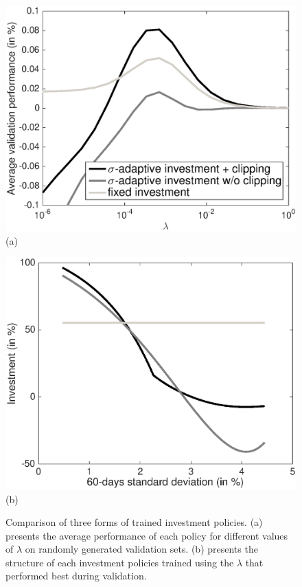 \documentclass[]{interact}
\theoremstyle{plain}%
\theoremstyle{definition}
\theoremstyle{remark}
\newcommand{\0}{\V{0}}
\newcommand{\1}{\V{1}}
\theoremstyle{plain}
\theoremstyle{definition}
\begin{document}
\begin{figure}[h]
\begin{minipage}[t]{0.45\linewidth}
	\centering
	\includegraphics[width=\linewidth]{crossValidate.eps}
	\mbox{(a)}
\end{minipage}
\hfill
\begin{minipage}[t]{0.45\linewidth}
	\centering
	\includegraphics[width=\linewidth]{Policy.eps}
	\mbox{(b)}
\end{minipage}%
\caption{Comparison of three forms of trained investment policies. (a) presents the average performance of each policy for different values of $\lambda$ on randomly generated validation sets. (b) presents the structure of each investment policies trained using the $\lambda$ that performed best during validation.}
\label{fig:crossvalidate}
\end{figure}
\end{document}
